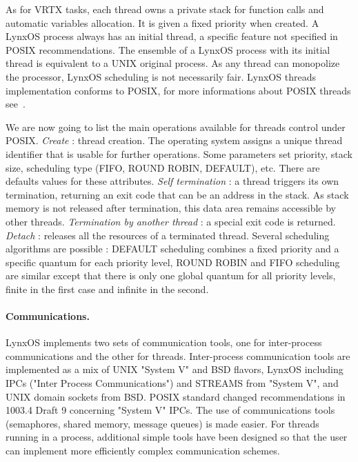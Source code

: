 \documentclass[10pt]{report}
\begin{document}
As for VRTX tasks, each thread owns a private stack for function calls and automatic variables allocation. It is given a fixed
priority when created. A LynxOS process always has an initial thread, a specific feature not specified in POSIX recommendations.
The ensemble of a LynxOS process with its initial thread is equivalent to a UNIX original process. As any thread can
monopolize the processor, LynxOS scheduling is not necessarily fair. LynxOS threads implementation conforms to POSIX, for more
informations about POSIX threads see~\cite{JMR:94}.

We are now going to list the main operations available for threads control under POSIX. {\em Create} : thread creation.
The operating system assigns a unique thread identifier that is usable for further operations. Some parameters set priority, stack size,
scheduling type (FIFO, ROUND ROBIN, DEFAULT), etc. There are defaults values for these attributes. {\em Self termination} :
a thread triggers its own termination, returning an exit code that can be an address in the stack. As stack memory is not released after
termination, this data area remains accessible by other threads. {\em Termination by another thread} : a special exit code is returned.
{\em Detach } : releases all the resources of a terminated thread. Several scheduling algorithms are possible : DEFAULT scheduling
combines a fixed priority and a specific quantum for each priority level, ROUND ROBIN and FIFO scheduling are similar except that there
is only one global quantum for all priority levels, finite in the first case and infinite in the second.

\paragraph{Communications.} LynxOS implements two sets of communication tools, one for inter-process communications and the other for
threads. Inter-process communication tools are implemented as a mix of UNIX "System V" and BSD flavors, LynxOS including IPCs ("Inter
Process Communications") and STREAMS from "System V", and UNIX domain sockets from BSD. POSIX standard changed recommendations
in 1003.4 Draft 9 concerning "System V" IPCs. The use of communications tools (semaphores, shared memory, message queues) is made
easier. For threads running in a process, additional simple tools have been designed so that the user can implement more efficiently
complex communication schemes.
\end{document}

